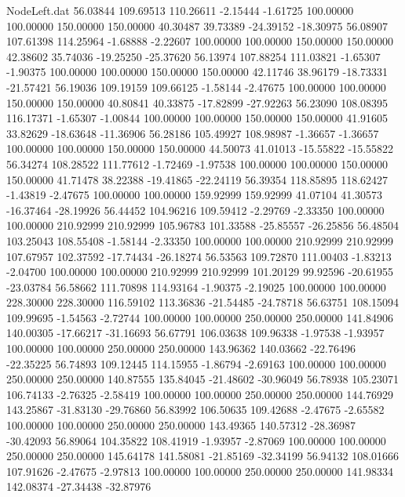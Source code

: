 \begin{filecontents}{NodeLeft.dat}
  56.03844  109.69513  110.26611    -2.15444   -1.61725  100.00000  100.00000  150.00000  150.00000   40.30487   39.73389  -24.39152  -18.30975
  56.08907  107.61398  114.25964    -1.68888   -2.22607  100.00000  100.00000  150.00000  150.00000   42.38602   35.74036  -19.25250  -25.37620
  56.13974  107.88254  111.03821    -1.65307   -1.90375  100.00000  100.00000  150.00000  150.00000   42.11746   38.96179  -18.73331  -21.57421
  56.19036  109.19159  109.66125    -1.58144   -2.47675  100.00000  100.00000  150.00000  150.00000   40.80841   40.33875  -17.82899  -27.92263
  56.23090  108.08395  116.17371    -1.65307   -1.00844  100.00000  100.00000  150.00000  150.00000   41.91605   33.82629  -18.63648  -11.36906
  56.28186  105.49927  108.98987    -1.36657   -1.36657  100.00000  100.00000  150.00000  150.00000   44.50073   41.01013  -15.55822  -15.55822
  56.34274  108.28522  111.77612    -1.72469   -1.97538  100.00000  100.00000  150.00000  150.00000   41.71478   38.22388  -19.41865  -22.24119
  56.39354  118.85895  118.62427    -1.43819   -2.47675  100.00000  100.00000  159.92999  159.92999   41.07104   41.30573  -16.37464  -28.19926
  56.44452  104.96216  109.59412    -2.29769   -2.33350  100.00000  100.00000  210.92999  210.92999  105.96783  101.33588  -25.85557  -26.25856
  56.48504  103.25043  108.55408    -1.58144   -2.33350  100.00000  100.00000  210.92999  210.92999  107.67957  102.37592  -17.74434  -26.18274
  56.53563  109.72870  111.00403    -1.83213   -2.04700  100.00000  100.00000  210.92999  210.92999  101.20129   99.92596  -20.61955  -23.03784
  56.58662  111.70898  114.93164    -1.90375   -2.19025  100.00000  100.00000  228.30000  228.30000  116.59102  113.36836  -21.54485  -24.78718
  56.63751  108.15094  109.99695    -1.54563   -2.72744  100.00000  100.00000  250.00000  250.00000  141.84906  140.00305  -17.66217  -31.16693
  56.67791  106.03638  109.96338    -1.97538   -1.93957  100.00000  100.00000  250.00000  250.00000  143.96362  140.03662  -22.76496  -22.35225
  56.74893  109.12445  114.15955    -1.86794   -2.69163  100.00000  100.00000  250.00000  250.00000  140.87555  135.84045  -21.48602  -30.96049
  56.78938  105.23071  106.74133    -2.76325   -2.58419  100.00000  100.00000  250.00000  250.00000  144.76929  143.25867  -31.83130  -29.76860
  56.83992  106.50635  109.42688    -2.47675   -2.65582  100.00000  100.00000  250.00000  250.00000  143.49365  140.57312  -28.36987  -30.42093
  56.89064  104.35822  108.41919    -1.93957   -2.87069  100.00000  100.00000  250.00000  250.00000  145.64178  141.58081  -21.85169  -32.34199
  56.94132  108.01666  107.91626    -2.47675   -2.97813  100.00000  100.00000  250.00000  250.00000  141.98334  142.08374  -27.34438  -32.87976

\end{filecontents}
